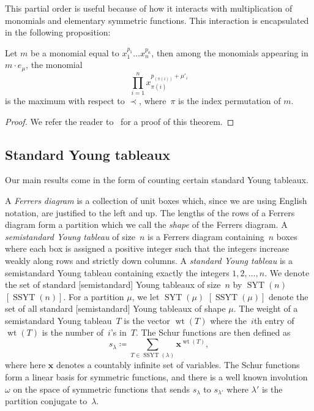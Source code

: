 \documentclass[ALCO,ThmDefs,Unicode,epreuves]{cedram}
\DeclareMathOperator{\wt}{wt}
\DeclareMathOperator{\SYT}{SYT}
\DeclareMathOperator{\SSYT}{SSYT}
\begin{document}
This partial order is useful because of how it interacts with multiplication of monomials and elementary symmetric functions. 
This interaction is encapsulated in the following proposition:

\begin{prop}

\label{Order}

Let $m$ be a monomial equal to $x_1^{p_1}\ldots x_n^{p_n}$, then
among the monomials appearing in $m\cdot e_{\mu}$, the monomial 
\begin{equation}
\prod_{i=1}^n x_{\pi(i)}^{p_{(\pi(i))}+\mu'_i}
\end{equation}
 is the maximum with respect to $\prec$, where~$\pi$ is the index permutation of $m$.
	\begin{proof}
	We refer the reader to~\cite{ABR} for a proof of this theorem.
	\end{proof}


\end{prop}


\subsection{Standard Young tableaux}

	Our main results come in the form of counting certain standard Young tableaux.

A \emph{Ferrers diagram} is a collection of unit boxes which, since we are using English notation, are justified to the left 
and up. The lengths of the rows of a Ferrers diagram form a partition which we call the \emph{shape} of the Ferrers diagram. 
A \emph{semistandard Young tableau} of size~$n$ is a Ferrers diagram containing~$n$ boxes where each box is assigned a 
positive integer such that the integers increase weakly along rows and strictly down columns. A \emph{standard Young tableau} 
is a semistandard Young tableau containing exactly the integers $1,2,\ldots, n$. We denote the set of standard [semistandard] 
Young tableaux of size~$n$ by $\SYT (n)$ $[\SSYT(n)]$. For a partition $\mu$, we let $\SYT (\mu)$ $[\SSYT(\mu)]$ denote the set of all 
standard [semistandard] Young tableaux of shape $\mu$. The weight of a semistandard Young tableau~$T$ is the vector $\wt (T)$ 
where the~$i$th entry of $\wt (T)$ is the number of~$i$'s in~$T$. The Schur functions are then defined as 
\begin{equation}
s_\lambda\coloneqq \sum_{T\in \SSYT(\lambda)} \mathbf{x}^{\wt (T)},
\end{equation}
 where here $\mathbf{x}$ denotes a countably infinite set of variables.
The Schur functions form a linear basis for symmetric functions, and there is a well known involution $\omega$ on the space of 
symmetric functions that sends $s_\lambda$ to $s_{\lambda'}$ where $\lambda'$ is the partition conjugate to~$\lambda$.
\end{document}
